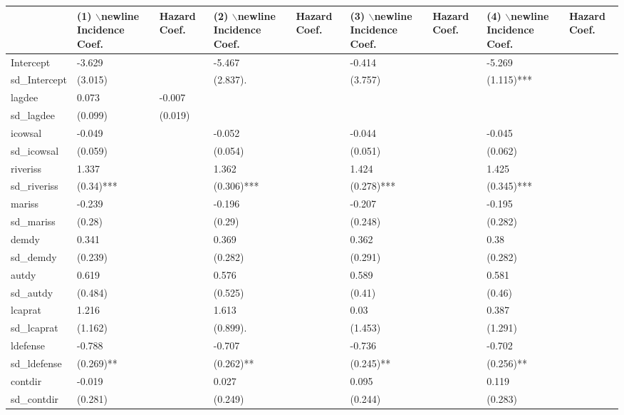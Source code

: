 \begin{table}[ht]
\centering
\begin{tabular}{lllllllll}
  \hline
  & (1) $\backslash$newline Incidence Coef. &  Hazard Coef. & (2) $\backslash$newline Incidence Coef. &  Hazard Coef. & (3) $\backslash$newline Incidence Coef. &  Hazard Coef. & (4) $\backslash$newline Incidence Coef. &  Hazard Coef. \\ 
  \hline
Intercept & -3.629 &  & -5.467 &  & -0.414 &  & -5.269 &  \\ 
  sd\_Intercept & (3.015)  &  & (2.837). &  & (3.757)  &  & (1.115)*** &  \\ 
  lagdee & 0.073 & -0.007 &  &  &  &  &  &  \\ 
  sd\_lagdee & (0.099)  & (0.019)  &  &  &  &  &  &  \\ 
  icowsal & -0.049 &  & -0.052 &  & -0.044 &  & -0.045 &  \\ 
  sd\_icowsal & (0.059)  &  & (0.054)  &  & (0.051)  &  & (0.062)  &  \\ 
  riveriss & 1.337 &  & 1.362 &  & 1.424 &  & 1.425 &  \\ 
  sd\_riveriss & (0.34)*** &  & (0.306)*** &  & (0.278)*** &  & (0.345)*** &  \\ 
  mariss & -0.239 &  & -0.196 &  & -0.207 &  & -0.195 &  \\ 
  sd\_mariss & (0.28)  &  & (0.29)  &  & (0.248)  &  & (0.282)  &  \\ 
  demdy & 0.341 &  & 0.369 &  & 0.362 &  & 0.38 &  \\ 
  sd\_demdy & (0.239)  &  & (0.282)  &  & (0.291)  &  & (0.282)  &  \\ 
  autdy & 0.619 &  & 0.576 &  & 0.589 &  & 0.581 &  \\ 
  sd\_autdy & (0.484)  &  & (0.525)  &  & (0.41)  &  & (0.46)  &  \\ 
  lcaprat & 1.216 &  & 1.613 &  & 0.03 &  & 0.387 &  \\ 
  sd\_lcaprat & (1.162)  &  & (0.899). &  & (1.453)  &  & (1.291)  &  \\ 
  ldefense & -0.788 &  & -0.707 &  & -0.736 &  & -0.702 &  \\ 
  sd\_ldefense & (0.269)** &  & (0.262)** &  & (0.245)** &  & (0.256)** &  \\ 
  contdir & -0.019 &  & 0.027 &  & 0.095 &  & 0.119 &  \\ 
  sd\_contdir & (0.281)  &  & (0.249)  &  & (0.244)  &  & (0.283)  &  \\ 

\end{tabular}
\end{table}
